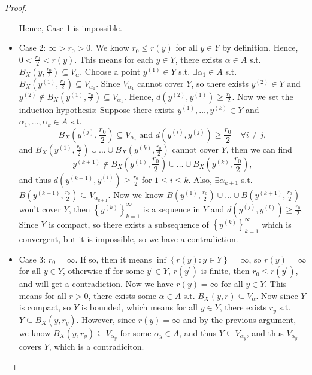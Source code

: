 \begin{proof}
\begin{itemize}
            Hence, Case 1 is impossible. 
            \item Case 2: \( \infty > r_0 > 0\).   We know \(r_0 \le r(y)\) for all \(y \in Y\) by definition. Hence, \(0 < \frac{r_0}{2} < r(y)\). This means for each \(y \in Y\), there exists \(\alpha \in A\) s.t. \(B_X \left( y, \frac{r_0}{2} \right) \subseteq V_\alpha   \). Choose a point \(y^{(1)} \in Y\) s.t. \(\exists \alpha _1 \in A\) s.t. \(B_X \left( y^{(1)}, \frac{r_0}{2} \right) \subseteq V_{\alpha _1} \). Since \(V_{\alpha _1}\) cannot cover \(Y\), so there exists \(y^{(2)}\in Y\) and \(y^{(2)} \notin B_X \left( y^{(1)}, \frac{r_0}{2} \right) \subseteq V_{\alpha _1} \). Hence, \(d\left( y^{(2)}, y^{(1)} \right) \ge \frac{r_0}{2} \). Now we set the induction hypothesis: Suppose there exists \(y^{(1)}, \dots , y^{(k)} \in Y\) and \(\alpha _1, \dots , \alpha _k \in A\) s.t. 
            \[
                B_X \left( y^{(j)}, \frac{r_0}{2} \right) \subseteq V_{\alpha _j} \text{ and } d \left( y^{(i)}, y^{(j)} \right) \ge \frac{r_0}{2} \quad \forall i \neq j, 
            \] and \(B_X \left( y^{(1)}, \frac{r_0}{2} \right) \cup  \dots \cup B_X \left( y^{(k)}, \frac{r_0}{2} \right)  \) cannot cover \(Y\), then we can find
            \[
                y^{(k + 1)} \notin B_X \left( y^{(1)}, \frac{r_0}{2} \right) \cup  \dots \cup B_X \left( y^{(k)}, \frac{r_0}{2} \right), 
            \] and thus \(d\left( y^{(k+1)}, y^{(i)} \right) \ge \frac{r_0}{2} \) for \(1 \le i \le k\). Also, \(\exists \alpha _{k+1} \) s.t. \(B\left( y^{(k+1)}, \frac{r_0}{2} \right) \subseteq V_{\alpha_{k+1}} \). Now we know \(B\left( y^{(1)}, \frac{r_0}{2} \right) \cup \dots \cup B\left( y^{(k+1)}, \frac{r_0}{2} \right)  \) won't cover \(Y\), then \(\left\{ y^{(k)} \right\}_{k=1}^{\infty}  \) is a sequence in \(Y\) and \(d\left( y^{(j)}, y^{(l)} \right) \ge \frac{r_0}{2} \). Since \(Y\) is compact, so there exists a subsequence of \(\left\{ y^{(k)} \right\}_{k=1}^{\infty}  \) which is convergent, but it is impossible, so we have a contradiction. 
            \item Case 3: \(r_0 = \infty \). If so, then it means \(\inf \left\{ r(y) : y \in Y \right\} = \infty  \), so \(r(y) = \infty \) for all \(y \in Y\), otherwise if for some \(y^{\prime} \in Y\), \(r\left( y^{\prime}  \right) \) is finite, then \(r_0 \le r\left( y^{\prime}  \right) \), and will get a contradiction. Now we have \(r(y) = \infty \) for all \(y \in Y\). This means for all \(r > 0\), there exists some \(\alpha \in A\) s.t. \(B_X(y, r) \subseteq V_\alpha \). Now since \(Y\) is compact, so \(Y\) is bounded, which means for all \(y \in Y\), there exists \(r_y\) s.t. \(Y \subseteq B_X(y, r_y)\). However, since \(r(y) = \infty \) and by the previous argument, we know \(B_X(y, r_y) \subseteq V_{\alpha _y}\) for some \(\alpha_y \in A\), and thus \(Y \subseteq V_{\alpha _y}\), and thus \(V_{\alpha _y}\) covers \(Y\), which is a contradiciton.                              
        \end{itemize}      
\end{proof}